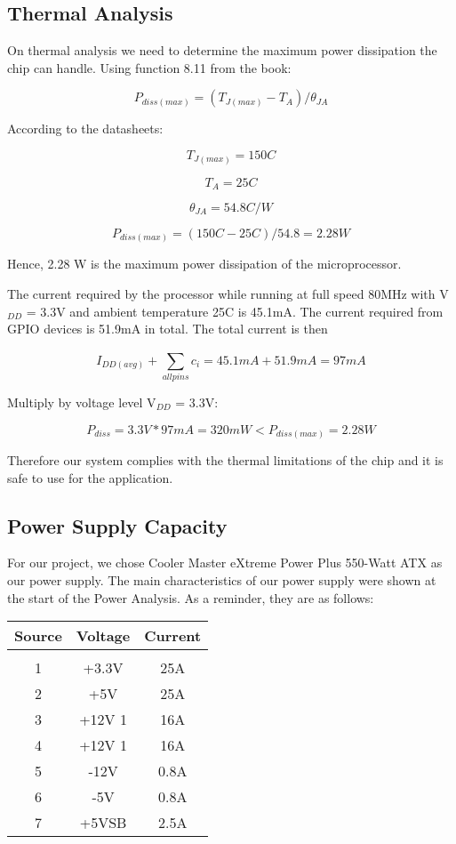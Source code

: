 	\subsection{Thermal Analysis}

		On thermal analysis we need to determine the maximum power dissipation the chip can handle. Using function 8.11 from the book:

				$$P_{diss(max)}=(T_{J(max)}-T_{A})/\theta_{JA}$$

		According to the datasheets:

				$$T_{J(max)} = 150 C$$
				
				$$T_{A} = 25 C$$

				$$\theta_{JA}=54.8 C/W$$

				$$P_{diss(max)}=(150C-25C) / 54.8 = 2.28 W $$

		Hence, 2.28 W is the maximum power dissipation of the microprocessor.

		The current required by the processor while running at full speed 80MHz with V$_{DD}$ = 3.3V and ambient temperature 25C is 45.1mA. The current required from GPIO devices is 51.9mA in total. The total current is then

			$$I_{DD(avg)} + \sum_{allpins}^{} c_i = 45.1mA + 51.9mA = 97 mA$$

		Multiply by voltage level V$_{DD}$ = 3.3V:

			$$P_{diss}= 3.3V * 97mA = 320 mW < P_{diss(max)}= 2.28 W $$

		Therefore our system complies with the thermal limitations of the chip and it is safe to use for the application.


	\subsection{Power Supply Capacity}

		For our project, we chose Cooler Master eXtreme Power Plus 550-Watt ATX as our power supply. The main characteristics of our power supply were shown at the start of the Power Analysis. As a reminder, they are as follows: 

		\begin{tabular}{|c|c|c|}
		\hline
		Source & Voltage & Current  \\
		\hline
		& & \\
		1 & +3.3V & 25A  \\
		2 & +5V & 25A  \\
		3 & +12V 1 & 16A  \\
		4 & +12V 1 & 16A  \\
		5 & -12V & 0.8A  \\
		6 & -5V & 0.8A  \\
		7 & +5VSB & 2.5A  \\
		\hline
		\end{tabular} \\

